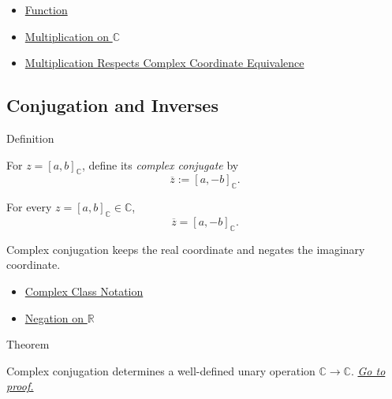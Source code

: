 \begin{dependencies}
\begin{itemize}
  \item \hyperref[def:function]{Function}
  \item \hyperref[def:multiplication-on-c-classes]{Multiplication on $\mathbb{C}$}
  \item \hyperref[lem:multiplication-on-c-respects-equivalence]{Multiplication Respects Complex Coordinate Equivalence}
\end{itemize}
\end{dependencies}

\subsection*{Conjugation and Inverses}

\begin{definitionbox}{Definition}
\begin{definition}
\label{def:complex-conjugation}
For \(z=[a,b]_{\mathbb{C}}\), define its \emph{complex conjugate} by
\[
\overline{z}:=[a,-b]_{\mathbb{C}}.
\]
\end{definition}
\end{definitionbox}


\begin{remark*}
For every $z=[a,b]_{\mathbb{C}}\in\mathbb{C}$,
\[
\overline{z}=[a,-b]_{\mathbb{C}}.
\]
\end{remark*}

\begin{remark*}[Interpretation]
Complex conjugation keeps the real coordinate and negates the imaginary
coordinate.
\end{remark*}

\begin{dependencies}
\begin{itemize}
  \item \hyperref[def:complex-class-notation]{Complex Class Notation}
  \item \hyperref[def:negation-on-r]{Negation on $\mathbb{R}$}
\end{itemize}
\end{dependencies}

\begin{theorembox}{Theorem}
\begin{theorem}
\label{thm:complex-conjugation-well-defined}
Complex conjugation determines a well-defined unary operation
\(\mathbb{C}\to\mathbb{C}\).
\hyperref[prf:complex-conjugation-well-defined]{\textit{Go to proof.}}
\end{theorem}
\end{theorembox}

